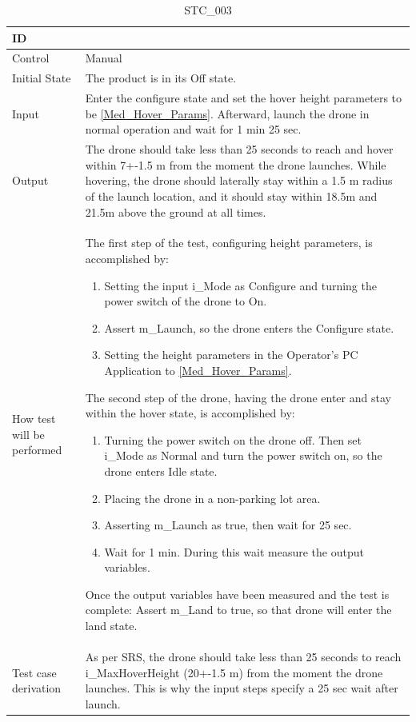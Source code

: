 \documentclass[12pt, titlepage]{article}
\begin{document}
\begin{table}[!h]
\begin{center}
\caption {STC\_003}
\label{tab:STC_003}
\begin{tabular}{ | m{1.5cm} | m{15cm} | } 
\hline
ID & \nameref{tab:STC_003}  \\ 
\hline
Control & Manual\\ 
\hline
Initial State & The product is in its Off state.
 \\ 
\hline
Input & Enter the configure state and set the hover height parameters to be \ref{Med_Hover_Params}. Afterward, launch the drone in normal operation and wait for 1 min 25 sec. \\ 
\hline
Output & The drone should take less than 25 seconds to reach and hover within 7+-1.5 m from the moment the drone launches. While hovering, the drone should laterally stay within a 1.5 m radius of the launch location, and it should stay within 18.5m and 21.5m above the ground at all times. 
 \\ 
\hline
How test will be performed &
The first step of the test, configuring height parameters, is accomplished by:
\begin{enumerate}[topsep=0pt,itemsep=-1ex,partopsep=1ex,parsep=1ex]
    \item Setting the input i\_Mode as Configure and turning the power switch of the drone to On.
    \item Assert m\_Launch, so the drone enters the Configure state.
    \item Setting the height parameters in the Operator's PC Application to \ref{Med_Hover_Params}.
\end{enumerate}
The second step of the drone, having the drone enter and stay within the hover state, is accomplished by:
\begin{enumerate}[topsep=0pt,itemsep=-1ex,partopsep=1ex,parsep=1ex]
	\item Turning the power switch on the drone off. Then set i\_Mode as Normal and turn the power switch on, so the drone enters Idle state.
	\item Placing the drone in a non-parking lot area. 
	\item Asserting m\_Launch as true, then wait for 25 sec.
	\item Wait for 1 min. During this wait measure the output variables.
\end{enumerate}
Once the output variables have been measured and the test is complete:
Assert m\_Land to true, so that drone will enter the land state.\\ 
\hline
Test case derivation & As per SRS, the drone should take less than 25 seconds to reach i\_MaxHoverHeight (20+-1.5 m) from the moment the drone launches. This is why the input steps specify a 25 sec wait after launch.


\end{tabular}
\end{center}
\end{table}
\end{document}
